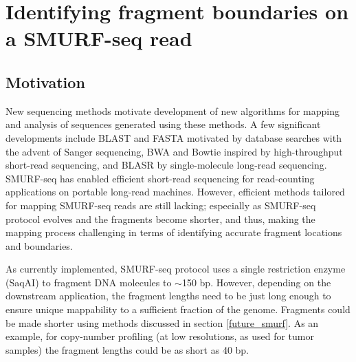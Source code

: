 \chapter{Identifying fragment boundaries on a SMURF-seq read}
\label{ch4}

\section{Motivation}
New sequencing methods motivate development of new algorithms for
mapping and analysis of sequences generated using these methods. A few
significant developments include BLAST \citep{altschul1990basic} and
FASTA \citep{pearson1988improved} motivated by database searches with
the advent of Sanger sequencing, BWA \citep{li2009fast} and Bowtie
\citep{langmead2009ultrafast} inspired by high-throughput short-read
sequencing, and BLASR \citep{chaisson2012mapping} by single-molecule
long-read sequencing.
SMURF-seq has enabled efficient short-read sequencing for read-counting
applications on portable long-read machines.  However, efficient methods
tailored for mapping SMURF-seq reads are still lacking; especially as
SMURF-seq protocol evolves and the fragments become shorter, and thus,
making the mapping process challenging in terms of identifying accurate
fragment locations and boundaries.

As currently implemented, SMURF-seq protocol uses a single restriction
enzyme (SaqAI) to fragment DNA molecules to $\sim$150 bp. However,
depending on the downstream application, the fragment lengths need to be
just long enough to ensure unique mappability to a sufficient fraction
of the genome.
Fragments could be made shorter using methods discussed in section
\ref{future_smurf}.  As an example, for copy-number profiling (at low
resolutions, as used for tumor samples) the fragment lengths could be as
short as 40 bp.

